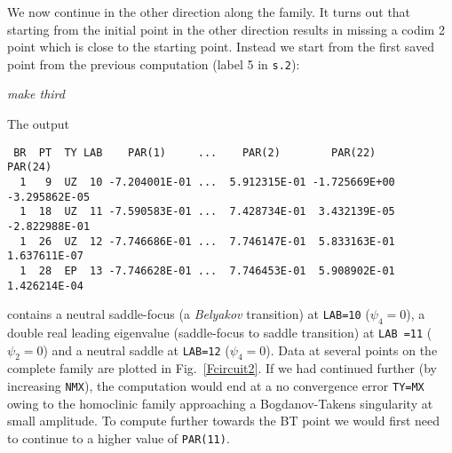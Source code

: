 \documentclass[12pt]{report}
\begin{document}
We now continue in the other direction along the family. It turns out
that starting from the initial point in the other direction results in
missing a codim 2 point which is close to the starting point. Instead we
start from the first saved point from the previous computation
(label 5 in {\tt s.2}):
\begin{center}
\it make third
\end{center}
The output
\begin{verbatim}
 BR  PT  TY LAB    PAR(1)     ...    PAR(2)        PAR(22)       PAR(24)    
  1   9  UZ  10 -7.204001E-01 ...  5.912315E-01 -1.725669E+00 -3.295862E-05
  1  18  UZ  11 -7.590583E-01 ...  7.428734E-01  3.432139E-05 -2.822988E-01
  1  26  UZ  12 -7.746686E-01 ...  7.746147E-01  5.833163E-01  1.637611E-07
  1  28  EP  13 -7.746628E-01 ...  7.746453E-01  5.908902E-01  1.426214E-04
\end{verbatim}
contains a neutral saddle-focus (a {\it Belyakov} transition) 
at {\tt LAB=10} ($\psi_4=0$), a double real leading eigenvalue 
(saddle-focus to saddle transition) at {\tt LAB =11} ($\psi_2=0$) 
and a neutral saddle at {\tt LAB=12} ($\psi_4=0$). Data at several
points on the complete family are plotted in Fig.\ \ref{Fcircuit2}.
If we had continued further (by increasing {\tt NMX}), 
the computation would end at a no convergence error {\tt TY=MX} owing 
to the homoclinic family approaching a Bogdanov-Takens singularity 
at small amplitude. To compute further towards the BT point 
we would first need to continue to a higher value of {\tt PAR(11)}.
\end{document}
